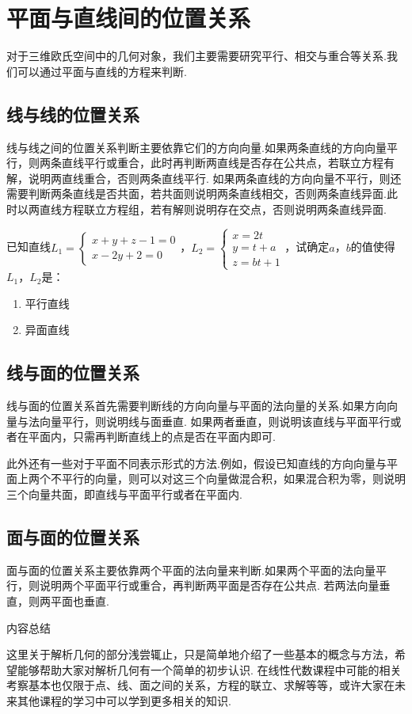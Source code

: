 \section{平面与直线间的位置关系}
对于三维欧氏空间中的几何对象，我们主要需要研究平行、相交与重合等关系.我们可以通过平面与直线的方程来判断.
\subsection{线与线的位置关系}
线与线之间的位置关系判断主要依靠它们的方向向量.如果两条直线的方向向量平行，则两条直线平行或重合，此时再判断两直线是否存在公共点，若联立方程有解，说明两直线重合，否则两条直线平行.
如果两条直线的方向向量不平行，则还需要判断两条直线是否共面，若共面则说明两条直线相交，否则两条直线异面.此时以两直线方程联立方程组，若有解则说明存在交点，否则说明两条直线异面.

\begin{example}
    已知直线$L_1=\begin{cases}
        x+y+z-1=0\\
        x-2y+2=0
    \end{cases}$，$L_2=\begin{cases}
        x=2t\\
        y=t+a\\
        z=bt+1
    \end{cases}$，试确定$a$，$b$的值使得$L_1$，$L_2$是：
    \begin{enumerate}
        \item 平行直线
        \item 异面直线
    \end{enumerate}
\end{example}

\subsection{线与面的位置关系}
线与面的位置关系首先需要判断线的方向向量与平面的法向量的关系.如果方向向量与法向量平行，则说明线与面垂直.
如果两者垂直，则说明该直线与平面平行或者在平面内，只需再判断直线上的点是否在平面内即可.

此外还有一些对于平面不同表示形式的方法.例如，假设已知直线的方向向量与平面上两个不平行的向量，则可以对这三个向量做混合积，如果混合积为零，则说明三个向量共面，即直线与平面平行或者在平面内.

\subsection{面与面的位置关系}
面与面的位置关系主要依靠两个平面的法向量来判断.如果两个平面的法向量平行，则说明两个平面平行或重合，再判断两平面是否存在公共点.
若两法向量垂直，则两平面也垂直.
\vspace{2ex}
\centerline{\heiti \Large 内容总结}
这里关于解析几何的部分浅尝辄止，只是简单地介绍了一些基本的概念与方法，希望能够帮助大家对解析几何有一个简单的初步认识.
在线性代数课程中可能的相关考察基本也仅限于点、线、面之间的关系，方程的联立、求解等等，或许大家在未来其他课程的学习中可以学到更多相关的知识.
\vspace{2ex}

